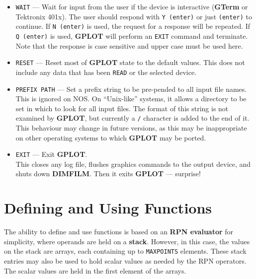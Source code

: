 \documentclass[a4paper,twoside,11pt]{article}
\newcommand{\textttc}[1]{\texttt{\textcolor{OurRed}{#1}}}
\begin{document}
\begin{itemize}
\item \textttc{WAIT} --- Wait for input from the user if the device is interactive (\textbf{GTerm} or Tektronix 401x).
  The user should respond with \texttt{Y (enter)} or just \texttt{(enter)} to continue.
  If \texttt{N (enter)} is used, the request
  for a response will be repeated. If \texttt{Q (enter)} is used, \textbf{GPLOT} will perform
  an \texttt{EXIT} command and terminate. Note that the response is case sensitive and upper case must be used here.
\item \textttc{RESET} --- Reset most of \textbf{GPLOT} state to the default values. This does not include any data that has been
  \texttt{READ} or the selected device.
\item \textttc{PREFIX PATH} --- Set a prefix string to be pre-pended to all input file names.\\
  This is ignored on NOS. On ``Unix-like'' systems, it allows a directory to be set in which to look for all
  input files. The format of this string is not examined by \textbf{GPLOT}, but currently a \texttt{/} character is added to the end
  of it. This behaviour may change in future versions, as this may be inappropriate on other operating systems to which
  \textbf{GPLOT} may be ported.
\item \textttc{EXIT} --- Exit \textbf{GPLOT}.\\
   This closes any log file, flushes graphics commands to the output device, and shuts down \textbf{DIMFILM}. 
   Then it exits \textbf{GPLOT} --- surprise!
\end{itemize}

\section{Defining and Using Functions}
The ability to define and use functions is based on an \textbf{RPN evaluator} for simplicity, where operands are held on a \textbf{stack}.
However, in this case, the values on the
stack are arrays, each containing up to \texttt{MAXPOINTS} elements. These stack entries may also be used to hold scalar values
as needed by the RPN operators. The scalar values are held in the first element of the arrays. 
\end{document}
